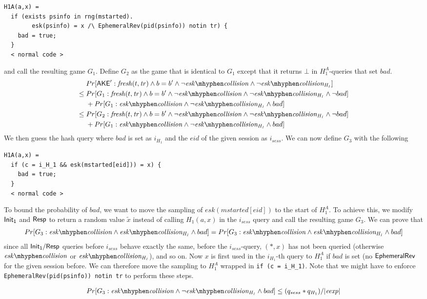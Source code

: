 \documentclass[]{article}
\begin{document}
\begin{verbatim}
H1A(a,x) =
  if (exists psinfo in rng(mstarted).
        esk(psinfo) = x /\ EphemeralRev(pid(psinfo)) notin tr) {
    bad = true;
  }
  < normal code >
\end{verbatim}
%
and call the resulting game $G_1$.
Define $G_2$ as the game that is identical to $G_1$ except that it
  returns $\bot$ in $H_1^A$-queries that set $bad$.
\begin{align*}
  &        Pr[\Ake' : \fresh(t, \tr) \land b = b' \land \neg \eskColl \land \neg \eskHColl] \\
  \leq{}&  Pr[G_1 : \fresh(t, \tr) \land b = b' \land \neg \eskColl \land \neg \eskHColl \land \neg bad] \\
        &  + Pr[G_1 : \eskColl \land \neg \eskHColl \land bad] \\
  \leq{}&  Pr[G_2 : \fresh(t, \tr) \land b = b' \land \neg \eskColl \land \neg \eskHColl \land \neg bad] \\
        &  + Pr[G_1 : \eskColl \land \neg \eskHColl \land bad]
\end{align*}
%
We then guess the hash query where $bad$ is set as $i_{H_1}$ and
 the $eid$ of the given session as $i_{sess}$.
%
We can now define $G_3$ with the following
\begin{verbatim}
H1A(a,x) =
  if (c = i_H_1 && esk(mstarted[eid])) = x) {
    bad = true;
  }
  < normal code >
\end{verbatim}
To bound the probability of $bad$, we want to move the sampling of $esk(mstarted[eid])$
  to the start of $H_1^A$.
To achieve this, we modify $\mathsf{Init_1}$ and $\mathsf{Resp}$ to return a random value $\tilde{x}$ instead
  of calling $H_1(a,x)$ in the $i_{sess}$ query and call the resulting game $G_3$.
We can prove that
\[
  Pr[G_3 : \eskColl \land \eskHColl \land bad] = Pr[G_3 : \eskColl \land \eskHColl \land bad]
\]
%
  since all $\mathsf{Init_1}/\mathsf{Resp}$ queries before $i_{sess}$ behave exactly the same,
  before the $i_{sess}$-query, $(*,x)$ has not been queried (otherwise $\eskColl$ or $\eskHColl$),
  and so on.
%
Now $x$ is first used in the $i_{H_1}$-th query to $H_1^A$ if $bad$ is set (no $\mathsf{EphemeralRev}$ for
  the given session before.
We can therefore move the sampling to $H_1^A$ wrapped in \verb+if (c = i_H_1)+.
Note that we might have to enforce \verb+EphemeralRev(pid(psinfo)) notin tr+ to perform
  these steps.
  
\begin{align*}
        Pr[G_3 : \eskColl \land \neg \eskHColl \land bad] \leq (q_{sess} * q_{H_1})/ |\eexp|
\end{align*}
\end{document}
